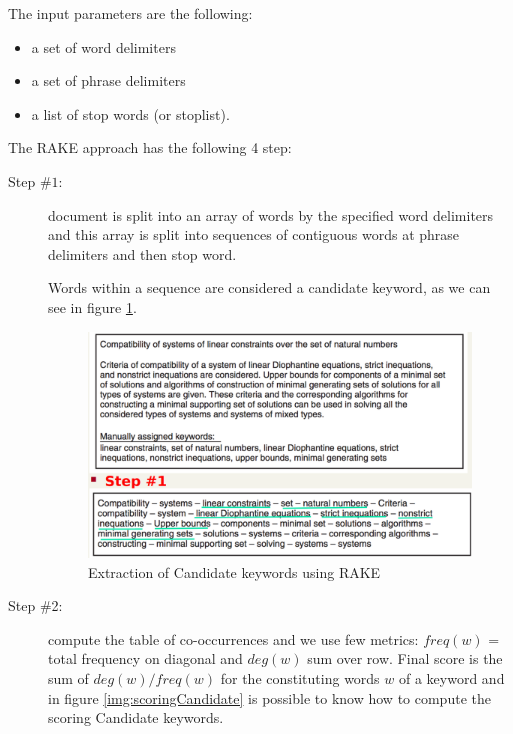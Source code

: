 \begin{enumerate}
	  The input parameters are the following:
	  \begin{itemize}
		\item a set of word delimiters
		\item a set of phrase delimiters
		\item a list of stop words (or stoplist).
	   \end{itemize}
	   The RAKE approach has the following 4 step:
	   \begin{description}
		\item [Step $\#1$: ] document is split into an array of words by the specified word delimiters and 
		      this array is split into sequences of contiguous words at phrase delimiters and then stop word.

		      Words within a sequence are considered a candidate keyword, as we can see in figure 
		      \ref{img:rake}.

		      \begin{figure}
			      \caption{Extraction of Candidate keywords using RAKE}
			      \label{img:rake}
			      \includegraphics[width=\textwidth]{Images/rake}
		      \end{figure}

		\item [Step \#2: ] compute the table of co-occurrences and we use few metrics:
			          $freq(w)$ = total frequency on diagonal and $deg(w)$ sum over row.\newline
                                  Final score is the sum of $deg(w)/freq(w)$ for the constituting words $w$ 
				  of a keyword and in figure \ref{img:scoringCandidate} is possible to know how
				  to compute the scoring Candidate keywords.


\end{description}
\end{enumerate}
